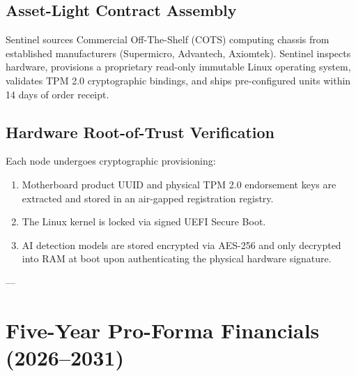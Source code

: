 \documentclass[11pt,a4paper]{article}
\begin{document}
\subsection{Asset-Light Contract Assembly}
Sentinel sources Commercial Off-The-Shelf (COTS) computing chassis from established manufacturers (Supermicro, Advantech, Axiomtek). Sentinel inspects hardware, provisions a proprietary read-only immutable Linux operating system, validates TPM 2.0 cryptographic bindings, and ships pre-configured units within 14 days of order receipt.

\subsection{Hardware Root-of-Trust Verification}
Each node undergoes cryptographic provisioning:
\begin{enumerate}
    \item Motherboard product UUID and physical TPM 2.0 endorsement keys are extracted and stored in an air-gapped registration registry.
    \item The Linux kernel is locked via signed UEFI Secure Boot.
    \item AI detection models are stored encrypted via AES-256 and only decrypted into RAM at boot upon authenticating the physical hardware signature.
\end{enumerate}

---

\section{Five-Year Pro-Forma Financials (2026--2031)}
\end{document}

